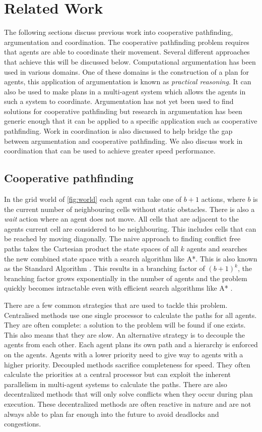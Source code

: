\section{Related Work}\label{sec:related}
The following sections discuss previous work into cooperative pathfinding,
argumentation and coordination. The cooperative pathfinding problem requires
that agents are able to coordinate their movement. Several different approaches
that achieve this will be discussed below. Computational argumentation has been
used in various domains. One of these domains is the construction of a plan for 
agents, this application of argumentation is known as
\emph{practical reasoning}. It can also be used to make plans in a multi-agent
system which allows the agents in such a system to coordinate. Argumentation has
not yet been used to find solutions for cooperative pathfinding but research
in argumentation has been generic enough that it can be applied to a specific
application such as cooperative pathfinding. Work in coordination is also
discussed to help bridge the gap between argumentation and cooperative
pathfinding. We also discuss work in coordination that can be used to achieve
greater speed performance.

\subsection{Cooperative pathfinding}

In the grid world of \autoref{fig:world} each agent can take one of $b+1$
actions, where $b$ is the current number of neighbouring cells without static
obstacles. There is also a \textit{wait} action
where an agent does not move. All cells that are adjacent to the agents current
cell are considered to be neighbouring. This includes cells that can be reached
by moving diagonally. The naive approach to finding conflict free paths takes
the Cartesian product the state spaces of all $k$ agents and searches the new
combined state space with a search algorithm like A*. This is also known as the
Standard Algorithm \cite{standley2010}. This results in a branching factor of
$(b+1)^k$, the branching factor grows exponentially in the number of agents and
the problem quickly becomes intractable even with efficient search algorithms
like A* \cite{sharon2013}.

There are a few common strategies that are used to tackle this problem.
Centralised methods use one single processor to calculate the paths for all
agents. They are often complete: a solution to the problem will be found if
one exists. This also means that they are slow. An alternative strategy is to
decouple the agents from each other. Each agent plans its own path and a
hierarchy is enforced on the agents. Agents with a lower priority need
to give way to agents with a higher priority. Decoupled methods sacrifice
completeness for speed. They often calculate the priorities at a central
processor but can exploit the inherent parallelism in multi-agent systems to
calculate the paths. There are also decentralized methods that will only solve
conflicts when they occur during plan execution. These decentralized methods
are often reactive in nature and are not always able to plan far enough into
the future to avoid deadlocks and congestions.

